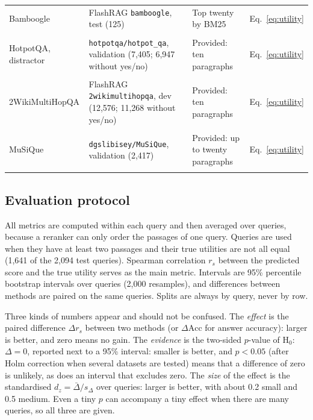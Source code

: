 \documentclass[preprint,12pt,authoryear]{elsarticle}
\begin{document}
\begin{table}[htbp]
\begin{tabularx}{\textwidth}{YYYY}
        Bamboogle \citep{press2023} & FlashRAG \texttt{bamboogle}, test (125) & Top twenty by BM25 & Eq.~\eqref{eq:utility} \\\\
        HotpotQA, distractor \citep{yang2018} & \texttt{hotpotqa/hotpot\_qa}, validation (7,405; 6,947 without yes/no) & Provided: ten paragraphs & Eq.~\eqref{eq:utility} \\\\
        2WikiMultiHopQA \citep{ho2020} & FlashRAG \texttt{2wikimultihopqa}, dev (12,576; 11,268 without yes/no) & Provided: ten paragraphs & Eq.~\eqref{eq:utility} \\\\
        MuSiQue \citep{trivedi2022} & \texttt{dgslibisey/MuSiQue}, validation (2,417) & Provided: up to twenty paragraphs & Eq.~\eqref{eq:utility} \\\\
        \bottomrule
    \end{tabularx}
\end{table}


\subsection{Evaluation protocol}
All metrics are computed within each query and then averaged over queries, because a reranker can only order the passages of one query. Queries are used when they have at least two passages and their true utilities are not all equal (1,641 of the 2,094 test queries). Spearman correlation $r_s$ between the predicted score and the true utility serves as the main metric. Intervals are 95\% percentile bootstrap intervals over queries (2,000 resamples), and differences between methods are paired on the same queries. Splits are always by query, never by row.

Three kinds of numbers appear and should not be confused. The \emph{effect} is the paired difference $\Delta r_s$ between two methods (or $\Delta\mathrm{Acc}$ for answer accuracy): larger is better, and zero means no gain. The \emph{evidence} is the two-sided $p$-value of H$_0$: $\Delta=0$, reported next to a 95\% interval: smaller is better, and $p<0.05$ (after Holm correction when several datasets are tested) means that a difference of zero is unlikely, as does an interval that excludes zero. The \emph{size} of the effect is the standardised $d_z=\bar{\Delta}/s_{\Delta}$ over queries: larger is better, with about 0.2 small and 0.5 medium. Even a tiny $p$ can accompany a tiny effect when there are many queries, so all three are given.
\end{document}
